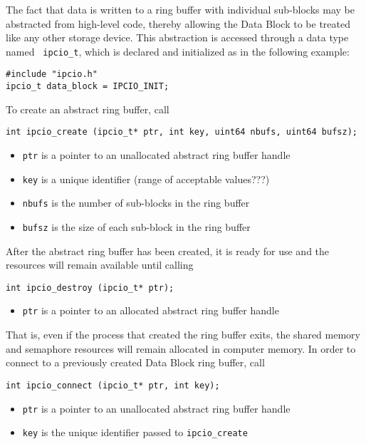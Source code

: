 The fact that data is written to a ring buffer with individual
sub-blocks may be abstracted from high-level code, thereby allowing
the Data Block to be treated like any other storage device.  This
abstraction is accessed through a data type named {\tt
ipcio\_t}, which is declared and initialized as in the following
example:
\begin{verbatim}
#include "ipcio.h"
ipcio_t data_block = IPCIO_INIT;
\end{verbatim}
To create an abstract ring buffer, call
\begin{verbatim}
int ipcio_create (ipcio_t* ptr, int key, uint64 nbufs, uint64 bufsz);
\end{verbatim}
\vspace{-6mm}
\begin{itemize}
\item {\tt ptr} is a pointer to an unallocated abstract ring buffer handle
\vspace{-2mm}
\item {\tt key} is a unique identifier (range of acceptable values???)
\vspace{-2mm}
\item {\tt nbufs} is the number of sub-blocks in the ring buffer
\vspace{-2mm}
\item {\tt bufsz} is the size of each sub-block in the ring buffer
\end{itemize}
After the abstract ring buffer has been created, it is ready for use
and the resources will remain available until calling
\begin{verbatim}
int ipcio_destroy (ipcio_t* ptr);
\end{verbatim}
\vspace{-6mm}
\begin{itemize}
\item {\tt ptr} is a pointer to an allocated abstract ring buffer handle
\end{itemize}
That is, even if the process that created the ring buffer exits, the
shared memory and semaphore resources will remain allocated in
computer memory.  In order to connect to a previously created Data
Block ring buffer, call
\begin{verbatim}
int ipcio_connect (ipcio_t* ptr, int key);
\end{verbatim}
\vspace{-6mm}
\begin{itemize}
\item {\tt ptr} is a pointer to an unallocated abstract ring buffer handle
\vspace{-2mm}
\item {\tt key} is the unique identifier passed to {\tt ipcio\_create}
\end{itemize}
